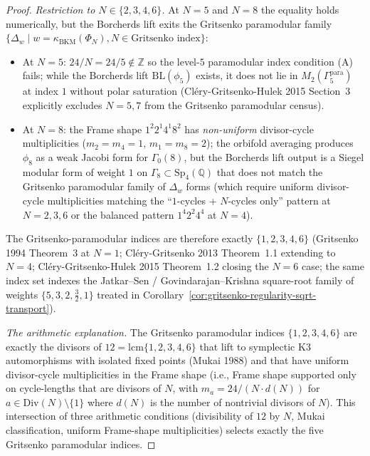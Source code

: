 \begin{proof}
\textit{Restriction to $N \in \{2, 3, 4, 6\}$.} At $N = 5$ and $N = 8$
the equality holds numerically, but the Borcherds lift exits the
Gritsenko paramodular family $\{\Delta_w \mid w = \kappa_{\mathrm{BKM}}(\Phi_N), N \in \text{Gritsenko index}\}$:
\begin{itemize}
\item At $N = 5$: $24 / N = 24/5 \notin \mathbb{Z}$ so the level-$5$
paramodular index condition (A) fails; while the Borcherds lift
$\mathrm{BL}(\phi_5)$ exists, it does not lie in
$M_{2}(\Gamma_5^{\mathrm{para}})$ at index $1$ without polar saturation
\textup{(Cl\'ery-Gritsenko-Hulek 2015 Section~3 explicitly excludes
$N = 5, 7$ from the Gritsenko paramodular census)}.
\item At $N = 8$: the Frame shape $1^2 2^1 4^1 8^2$ has \emph{non-uniform}
divisor-cycle multiplicities ($m_2 = m_4 = 1$, $m_1 = m_8 = 2$);
the orbifold averaging produces $\phi_8$ as a weak Jacobi form for
$\Gamma_0(8)$, but the Borcherds lift output is a Siegel modular form
of weight $1$ on $\Gamma_8 \subset \mathrm{Sp}_4(\mathbb{Q})$ that does
not match the Gritsenko paramodular family of $\Delta_w$ forms (which
require uniform divisor-cycle multiplicities matching the
``$1$-cycles + $N$-cycles only'' pattern at $N = 2, 3, 6$ or the
balanced pattern $1^4 2^2 4^4$ at $N = 4$).
\end{itemize}
The Gritsenko-paramodular indices are therefore exactly
$\{1, 2, 3, 4, 6\}$ \textup{(Gritsenko 1994 Theorem~3 at $N = 1$;
Cl\'ery-Gritsenko 2013 Theorem~1.1 extending
to $N = 4$; Cl\'ery-Gritsenko-Hulek 2015 Theorem~1.2 closing the
$N = 6$ case; the same index set indexes the Jatkar--Sen /
Govindarajan--Krishna square-root family of weights
$\{5, 3, 2, \tfrac32, 1\}$ treated in
Corollary~\ref{cor:gritsenko-regularity-sqrt-transport})}.

\textit{The arithmetic explanation.} The Gritsenko paramodular indices
$\{1, 2, 3, 4, 6\}$ are exactly the divisors of
$12 = \mathrm{lcm}\{1, 2, 3, 4, 6\}$ that lift to symplectic K3
automorphisms with isolated fixed points (Mukai 1988) and that have
uniform divisor-cycle multiplicities in the Frame shape (i.e., Frame
shape supported only on cycle-lengths that are divisors of $N$, with
$m_a = 24/(N \cdot d(N))$ for $a \in \mathrm{Div}(N) \setminus \{1\}$
where $d(N)$ is the number of nontrivial divisors of $N$).
This intersection of three arithmetic conditions (divisibility of $12$
by $N$, Mukai classification, uniform Frame-shape multiplicities)
selects exactly the five Gritsenko paramodular indices.
\end{proof}


